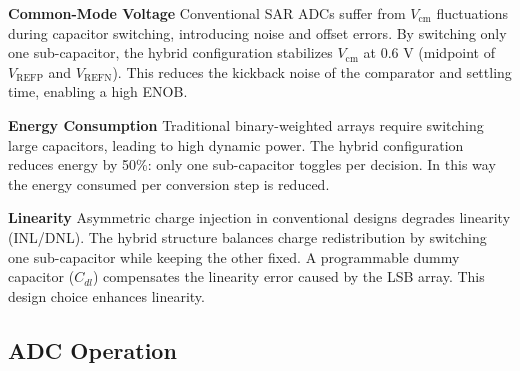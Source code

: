\textbf{Common-Mode Voltage}  
Conventional SAR ADCs suffer from $V_{\text{cm}}$ fluctuations during capacitor switching, introducing noise and offset errors. By switching only one sub-capacitor, the hybrid configuration stabilizes $V_{\text{cm}}$ at 0.6 V (midpoint of $V_{\text{REFP}}$ and $V_{\text{REFN}}$). This reduces the kickback noise of the comparator and settling time, enabling a high ENOB.

\textbf{Energy Consumption}  
Traditional binary-weighted arrays require switching large capacitors, leading to high dynamic power. The hybrid configuration reduces energy by 50\%: only one sub-capacitor toggles per decision. In this way the energy consumed per conversion step is reduced.

\textbf{Linearity}  
Asymmetric charge injection in conventional designs degrades linearity (INL/DNL). The hybrid structure balances charge redistribution by switching one sub-capacitor while keeping the other fixed. A programmable dummy capacitor ($C_{dl}$) compensates the linearity error caused by the LSB array. This design choice enhances linearity.

\subsection{ADC Operation}

